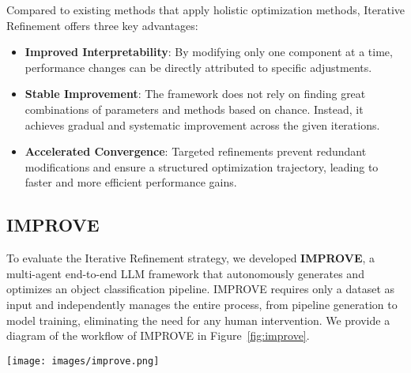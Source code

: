 Compared to existing methods that apply holistic optimization methods, Iterative Refinement offers three key advantages:
\begin{itemize}
    \item \textbf{Improved Interpretability}: By modifying only one component at a time, performance changes can be directly attributed to specific adjustments.
    \item \textbf{Stable Improvement}: The framework does not rely on finding great combinations of parameters and methods based on chance. Instead, it achieves gradual and systematic improvement across the given iterations.
    \item \textbf{Accelerated Convergence}: Targeted refinements prevent redundant modifications and ensure a structured optimization trajectory, leading to faster and more efficient performance gains.
\end{itemize}

\subsection{IMPROVE}
To evaluate the Iterative Refinement strategy, we developed \textbf{IMPROVE}, a multi-agent end-to-end LLM framework that autonomously generates and optimizes an object classification pipeline. IMPROVE requires only a dataset as input and independently manages the entire process, from pipeline generation to model training, eliminating the need for any human intervention. We provide a diagram of the workflow of IMPROVE in Figure~\ref{fig:improve}. 

\begin{figure*}[ht]
    \centering
    \texttt{[image: images/improve.png]}
    \caption{The IMPROVE framework employing Iterative Refinement. Users provide a dataset, and IMPROVE autonomously executes the model development process. The Project Architect designs the pipeline, which is implemented by specialized agents. The Performance Analyst iteratively refines components based on empirical feedback, optimizing the pipeline over multiple iterations. After a set number of iterations, a high-quality model is produced.}
    \label{fig:improve}
\end{figure*}

